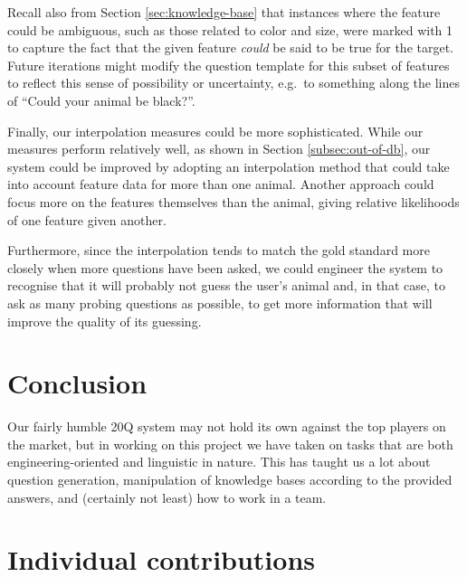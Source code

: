 \documentclass[11pt,a4paper]{article}
\begin{document}
Recall also from Section \ref{sec:knowledge-base} that instances where the feature could be ambiguous, such as those related to color and size, were marked with 1 to capture the fact that the given feature \textit{could} be said to be true for the target.
Future iterations might modify the question template for this subset of features to reflect this sense of possibility or uncertainty, e.g.\ to something along the lines of ``Could your animal be black?''.

Finally, our interpolation measures could be more sophisticated. 
While our measures perform relatively well, as shown in Section \ref{subsec:out-of-db}, our system could be improved by adopting an interpolation method that could take into account feature data for more than one animal. 
Another approach could focus more on the features themselves than the animal, giving relative likelihoods of one feature given another.

Furthermore, since the interpolation tends to match the gold standard more closely when more questions have been asked, we could engineer the system to recognise that it will probably not guess the user's animal and, in that case, to ask as many probing questions as possible, to get more information that will improve the quality of its guessing.

\section{Conclusion}
\label{sec:concl}

Our fairly humble 20Q system may not hold its own against the top players on the market, but in working on this project we have taken on tasks that are both engineering-oriented and linguistic in nature.
This has taught us a lot about question generation, manipulation of knowledge bases according to the provided answers, and (certainly not least) how to work in a team. 





\appendix

\section{Individual contributions}
\label{app:contributions}
\end{document}
